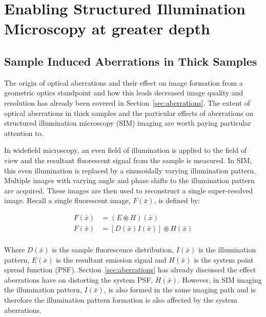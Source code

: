 \chapter{Enabling Structured Illumination Microscopy at greater depth}

\section{Sample Induced Aberrations in Thick Samples}
\label{sec:sample_aberrations_thick}

The origin of optical aberrations and their effect on image
formation from a geometric optics standpoint and how this leads 
decreased image quality and resolution has already been covered 
in Section~\ref{sec:aberrations}. The extent of optical 
aberrations in thick samples and the particular effects of
aberrations on structured illumination microscopy (SIM) imaging 
are worth paying particular attention to. 

In widefield microscopy, an even field of illumination is 
applied to the field of view and the resultant fluorescent
signal from the sample is measured. In SIM, this even 
illumination is replaced by a sinusoidally varying
illumination pattern. Multiple images with varying angle 
and phase shifts to the illumination pattern are acquired. 
These images are then used to reconstruct a single 
super-resolved image.\cite{gustafsson2000surpassing,gustafsson2008three}
Recall a single fluorescent image, $F(\bar{x})$, is 
defined by:

\begin{equation}\label{eq:SIM_fluorescent_image}
\begin{split}
	F(\bar{x}) &= (E \circledast H)(\bar{x})\\
	F(\bar{x}) &= [D(\bar{x})I(\bar{x})] \circledast H(\bar{x})\\
\end{split}
\end{equation}

Where $D(\bar{x})$ is the sample fluorescence distribution,
$I(\bar{x})$ is the illumination pattern, $E(\bar{x})$ is the 
resultant emission signal and $H(\bar{x})$ is the system point
spread function (PSF). Section~\ref{sec:aberrations} has already
discussed the effect aberrations have on distorting the system
PSF, $H(\bar{x})$. However, in SIM imaging the illumination 
pattern, $I(\bar{x})$, is also formed in the same imaging path
and is therefore the illumination pattern formation is also 
affected by the system aberrations.

